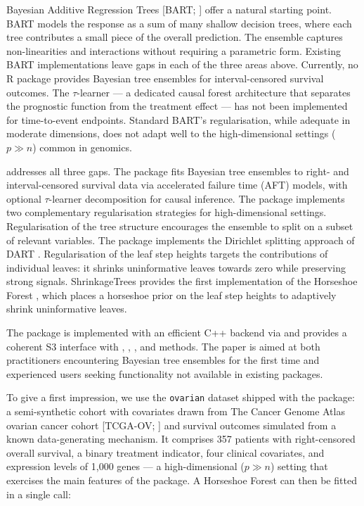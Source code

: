 Bayesian Additive Regression Trees {[}BART; \citet{chipman2010bart}{]} offer a natural starting point. BART models the response as a sum of many shallow decision trees, where each tree contributes a small piece of the overall prediction. The ensemble captures non-linearities and interactions without requiring a parametric form. Existing BART implementations leave gaps in each of the three areas above. Currently, no R package provides Bayesian tree ensembles for interval-censored survival outcomes. The \(\tau\)-learner --- a dedicated causal forest architecture that separates the prognostic function from the treatment effect \citep{hahn2020bayesian, caron2022estimating} --- has not been implemented for time-to-event endpoints. Standard BART's regularisation, while adequate in moderate dimensions, does not adapt well to the high-dimensional settings (\(p \gg n\)) common in genomics.

 addresses all three gaps. The package fits Bayesian tree ensembles to right- and interval-censored survival data via accelerated failure time (AFT) models, with optional \(\tau\)-learner decomposition for causal inference. The package implements two complementary regularisation strategies for high-dimensional settings. Regularisation of the tree structure encourages the ensemble to split on a subset of relevant variables. The package implements the Dirichlet splitting approach of DART \citep{linero2018dart}. Regularisation of the leaf step heights targets the contributions of individual leaves: it shrinks uninformative leaves towards zero while preserving strong signals. ShrinkageTrees provides the first implementation of the Horseshoe Forest \citep{jacobs2025horseshoe}, which places a horseshoe prior \citep{carvalho2010horseshoe} on the leaf step heights to adaptively shrink uninformative leaves.

The package is implemented with an efficient C++ backend via  \citep{eddelbuettel2011rcpp} and provides a coherent S3 interface with , , , and  methods. The paper is aimed at both practitioners encountering Bayesian tree ensembles for the first time and experienced users seeking functionality not available in existing packages.

To give a first impression, we use the \texttt{ovarian} dataset shipped with the package: a semi-synthetic cohort with covariates drawn from The Cancer Genome Atlas ovarian cancer cohort {[}TCGA-OV; \citet{tcga2011ovarian}{]} and survival outcomes simulated from a known data-generating mechanism. It comprises 357 patients with right-censored overall survival, a binary treatment indicator, four clinical covariates, and expression levels of 1,000 genes --- a high-dimensional (\(p \gg n\)) setting that exercises the main features of the package. A Horseshoe Forest can then be fitted in a single call:

